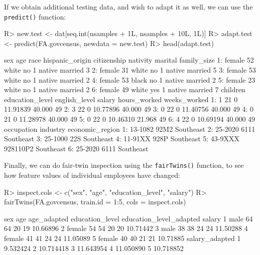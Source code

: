 \documentclass[
  notitle]{jss}
\begin{document}
If we obtain additional testing data, and wish to adapt it as well, we
can use the \texttt{predict()} function:

\begin{CodeChunk}
\begin{CodeInput}
R> new.test <- dat[seq.int(nsamples + 1L, nsamples + 10L, 1L)]
R> adapt.test <- predict(FA.govcensus, newdata = new.test)
R> head(adapt.test)
\end{CodeInput}
\begin{CodeOutput}
      sex age  race hispanic_origin citizenship nativity marital family_size
1: female  52 white              no           1   native married           3
2: female  31 white              no           1   native married           5
3: female  53 white              no           1   native married           2
4: female  53 black              no           1   native married           2
5: female  23 white              no           1   native married           2
6: female  49 white             yes           1   native married           7
   children education_level english_level   salary hours_worked weeks_worked
1:        1              21             0 11.91839       40.000           49
2:        3              22             0 10.77896       40.000           49
3:        0              22             0 11.40756       40.000           49
4:        0              21             0 11.28978       40.000           49
5:        0              22             0 10.46310       21.968           49
6:        4              22             0 10.69194       40.000           49
   occupation industry economic_region
1:    13-1082     92M2       Southeast
2:    25-2020     6111       Southeast
3:    25-1000      22S       Southeast
4:    11-91XX     928P       Southeast
5:    43-9XXX 928110P2       Southeast
6:    25-2020     6111       Southeast
\end{CodeOutput}
\end{CodeChunk}

Finally, we can do fair-twin inspection using the \texttt{fairTwins()}
function, to see how feature values of individual employees have
changed:

\begin{CodeChunk}
\begin{CodeInput}
R> inspect.cols <- c("sex", "age", "education_level", "salary")
R> fairTwins(FA.govcensus, train.id = 1:5, cols = inspect.cols)
\end{CodeInput}
\begin{CodeOutput}
     sex age age_adapted education_level education_level_adapted   salary
1   male  64          64              20                      19 10.66896
2 female  54          54              20                      20 10.71442
3   male  38          38              24                      24 11.50288
4 female  41          41              24                      24 11.05089
5 female  40          40              21                      21 10.71885
  salary_adapted
1       9.532424
2      10.714418
3      11.643954
4      11.050890
5      10.718852
\end{CodeOutput}
\end{CodeChunk}
\end{document}
